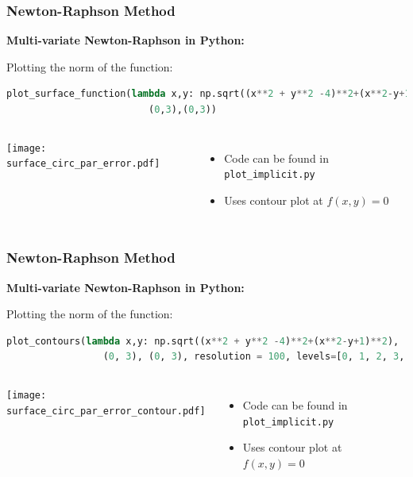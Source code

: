   
\begin{frame}[fragile]
  \frametitle{Newton-Raphson Method}

  \textbf{Multi-variate Newton-Raphson in Python:}
  
  Plotting the norm of the function:
  \begin{lstlisting}[language=Python]
plot_surface_function(lambda x,y: np.sqrt((x**2 + y**2 -4)**2+(x**2-y+1)**2),
                         (0,3),(0,3))
        \end{lstlisting}
        \begin{columns}
          \texttt{[image: surface\_circ\_par\_error.pdf]}
          \begin{itemize}
            \item Code can be found in \lstinline[language=Python]{plot_implicit.py}
            \item Uses contour plot at $f(x,y)=0$
          \end{itemize}
        \end{columns}
\end{frame}

\begin{frame}[fragile]
  \frametitle{Newton-Raphson Method}

  \textbf{Multi-variate Newton-Raphson in Python:}
  
  Plotting the norm of the function:
  \begin{lstlisting}[language=Python]
plot_contours(lambda x,y: np.sqrt((x**2 + y**2 -4)**2+(x**2-y+1)**2),
                 (0, 3), (0, 3), resolution = 100, levels=[0, 1, 2, 3, 4])
        \end{lstlisting}
        \begin{columns}
          \texttt{[image: surface\_circ\_par\_error\_contour.pdf]}
          \begin{itemize}
            \item Code can be found in \lstinline[language=Python]{plot_implicit.py}
            \item Uses contour plot at $f(x,y)=0$
          \end{itemize}
        \end{columns}
\end{frame}

